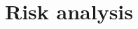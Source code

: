 \documentclass{report}
\begin{document}
	
	
	
	
	\chapter{Risk analysis}
	
	
	
	\printbibliography
	
\end{document}
